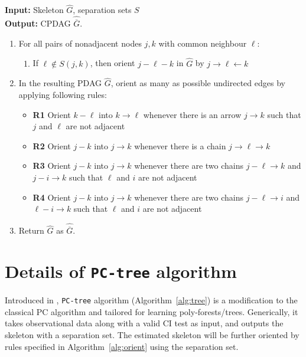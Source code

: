 \documentclass{article}
\theoremstyle{definition}
\theoremstyle{definition}
\theoremstyle{definition}
\theoremstyle{definition}
\theoremstyle{definition}
\theoremstyle{definition}
\theoremstyle{remark}
\theoremstyle{remark}
\newcommand{\mec}{\overline{G}}
\begin{document}
\begin{algorithm}[h]
\caption{\textsc{Orient} algorithm}\label{alg:orient}
\textbf{Input:} Skeleton $\widehat{G}$, separation sets $S$\\
\textbf{Output:} CPDAG $\widehat{\mec}$.
\begin{enumerate}
    \item For all pairs of nonadjacent nodes $j,k$ with common neighbour $\ell$:
    \begin{enumerate}
        \item If $\ell\not\in S(j,k)$, then orient $j-\ell-k$ in $\widehat{G}$ by $j\rightarrow\ell\leftarrow k$
    \end{enumerate}
    \item In the resulting PDAG $\widehat{G}$, orient as many as possible undirected edges by applying following rules:
    \begin{itemize}
        \item \textbf{R1} Orient $k-\ell$ into $k\rightarrow \ell$ whenever there is an arrow $j\rightarrow k$ such that $j$ and $\ell$ are not adjacent
        \item \textbf{R2} Orient $j-k$ into $j\rightarrow k$ whenever there is a chain $j\rightarrow \ell \rightarrow k$
        \item \textbf{R3} Orient $j-k$ into $j\rightarrow k$ whenever there are two chains $j- \ell\rightarrow k$ and $j - i \rightarrow k$ such that $\ell$ and $i$ are not adjacent
        \item \textbf{R4} Orient $j-k$ into $j\rightarrow k$ whenever there are two chains $j- \ell\rightarrow i$ and $\ell - i \rightarrow k$ such that $\ell$ and $i$ are not adjacent
    \end{itemize}
    \item Return $\widehat{G}$ as $\widehat{\mec}$.
\end{enumerate}
\end{algorithm}

\section{Details of \texttt{PC-tree} algorithm}\label{app:pctree}
Introduced in \citet{wang2024optimal}, \texttt{PC-tree} algorithm (Algorithm~\ref{alg:tree}) is a modification to the classical PC algorithm and tailored for learning poly-forests/trees. Generically, it takes observational data along with a valid CI test as input, and outputs the skeleton with a separation set. The estimated skeleton will be further oriented by rules specified in Algorithm~\ref{alg:orient} using the separation set.
\end{document}
